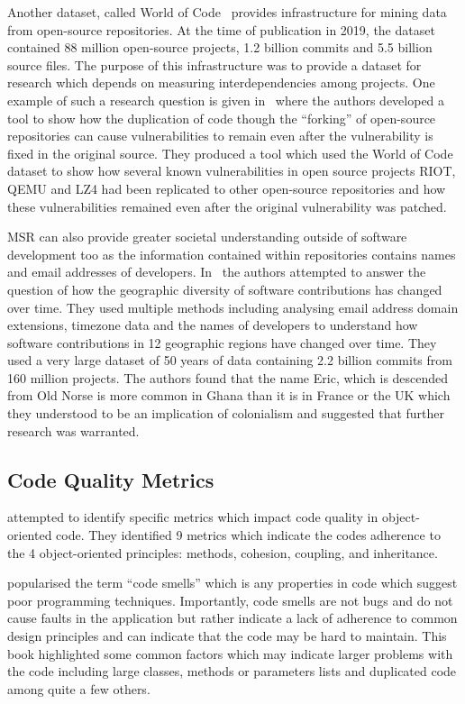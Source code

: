 Another dataset, called World of Code~\cite{world_of_code} provides infrastructure for mining data from open-source repositories.
At the time of publication in 2019, the dataset contained 88 million open-source projects, 1.2 billion commits and 5.5 billion source files.
The purpose of this infrastructure was to provide a dataset for research which depends on measuring interdependencies among projects.
One example of such a research question is given in~\cite{tracing_vulnerable_code_lineage} where the authors developed a tool to show how the duplication of code though the ``forking'' of open-source repositories can cause vulnerabilities to remain even after the vulnerability is fixed in the original source.
They produced a tool which used the World of Code dataset to show how several known vulnerabilities in open source projects RIOT, QEMU and LZ4 had been replicated to other open-source repositories and how these vulnerabilities remained even after the original vulnerability was patched.

MSR can also provide greater societal understanding outside of software development too as the information contained within repositories contains names and email addresses of developers.
In~\cite{geographic_diversity} the authors attempted to answer the question of how the geographic diversity of software contributions has changed over time.
They used multiple methods including analysing email address domain extensions, timezone data and the names of developers to understand how software contributions in 12 geographic regions have changed over time.
They used a very large dataset of 50 years of data containing 2.2 billion commits from 160 million projects.
The authors found that the name Eric, which is descended from Old Norse is more common in Ghana than it is in France or the UK which they understood to be an implication of colonialism and suggested that further research was warranted.

\subsection{Code Quality Metrics}
\label{subsec:code-quality-metrics}

\cite{rosenberg1997software} attempted to identify specific metrics which impact code quality in object-oriented code.
They identified 9 metrics which indicate the codes adherence to the 4 object-oriented principles: methods, cohesion, coupling, and inheritance.

\cite{beck1999bad} popularised the term ``code smells'' which is any properties in code which suggest poor programming techniques.
Importantly, code smells are not bugs and do not cause faults in the application but rather indicate a lack of adherence to common design principles and can indicate that the code may be hard to maintain.
This book highlighted some common factors which may indicate larger problems with the code including large classes, methods or parameters lists and duplicated code among quite a few others.

